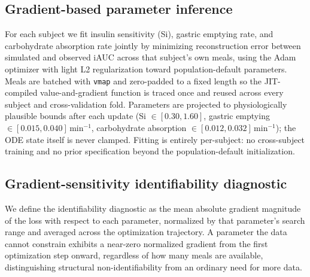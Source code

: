\documentclass[letterpaper]{article} %
\begin{document}
\subsection{Gradient-based parameter inference}
For each subject we fit insulin sensitivity (Si), gastric emptying rate, and carbohydrate
absorption rate jointly by minimizing reconstruction error between simulated and observed iAUC
across that subject's own meals, using the Adam optimizer with light L2 regularization toward
population-default parameters. Meals are batched with \texttt{vmap} and zero-padded to a fixed
length so the JIT-compiled value-and-gradient function is traced once and reused across every
subject and cross-validation fold. Parameters are projected to physiologically plausible bounds
after each update (Si $\in[0.30,1.60]$, gastric emptying $\in[0.015,0.040]\,\mathrm{min}^{-1}$,
carbohydrate absorption $\in[0.012,0.032]\,\mathrm{min}^{-1}$); the ODE state itself is never
clamped. Fitting is entirely per-subject: no cross-subject training and no prior specification
beyond the population-default initialization.

\subsection{Gradient-sensitivity identifiability diagnostic}
We define the identifiability diagnostic as the mean absolute gradient magnitude of the loss with
respect to each parameter, normalized by that parameter's search range and averaged across the
optimization trajectory. A parameter the data cannot constrain exhibits a near-zero normalized
gradient from the first optimization step onward, regardless of how many meals are available,
distinguishing structural non-identifiability from an ordinary need for more data.
\end{document}
